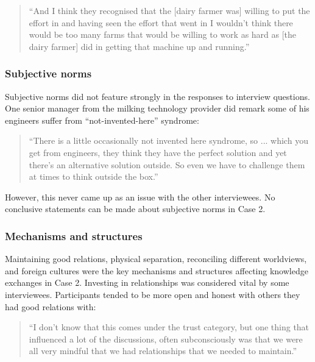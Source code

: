 \begin{quote}
\small
\enquote{And I think they recognised that the [dairy farmer was] willing to put the effort in and having seen the effort that went in I wouldn't think there would be too many farms that would be willing to work as hard as [the dairy farmer] did in getting that machine up and running.} \\
\end{quote}

\subsubsection{Subjective norms}

Subjective norms did not feature strongly in the responses to interview questions. One senior manager from the milking technology provider did remark some of his engineers suffer from \enquote{not-invented-here} syndrome:

\begin{quote}
\small
\enquote{There is a little occasionally not invented here syndrome, so ... which you get from engineers, they think they have the perfect solution and yet there’s an alternative solution outside. So even we have to challenge them at times to think outside the box.} \\
\end{quote}

However, this never came up as an issue with the other interviewees. No conclusive statements can be made about subjective norms in Case 2. 

\subsubsection{Mechanisms and structures}

Maintaining good relations, physical separation, reconciling different worldviews, and foreign cultures were the key mechanisms and structures affecting knowledge exchanges in Case 2. Investing in relationships was considered vital by some interviewees. Participants tended to be more open and honest with others they had good relations with:

\begin{quote}
\small
\enquote{I don't know that this comes under the trust category, but one thing that influenced a lot of the discussions, often subconsciously was that we were all very mindful that we had relationships that we needed to maintain.} \\
\end{quote}

